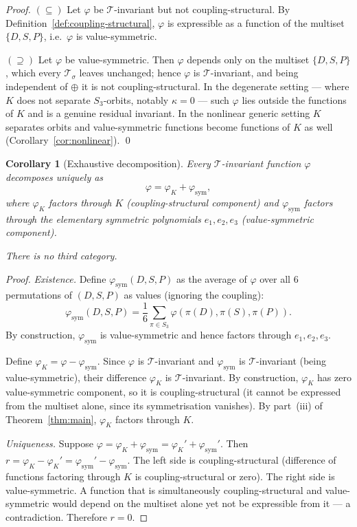 \documentclass[12pt,a4paper]{article}
\theoremstyle{definition}
\theoremstyle{plain}
\newtheorem{corollary}[theorem]{Corollary}
\theoremstyle{remark}
\newcommand{\T}{\mathcal{T}}
\begin{document}
\begin{proof}
$(\subseteq)$\; Let $\varphi$ be $\T$-invariant but not coupling-structural. By Definition~\ref{def:coupling-structural}, $\varphi$ is expressible as a function of the multiset $\{D, S, P\}$, i.e.\ $\varphi$ is value-symmetric.

$(\supseteq)$\; Let $\varphi$ be value-symmetric. Then $\varphi$ depends only on the multiset $\{D,S,P\}$, which every $\T_\sigma$ leaves unchanged; hence $\varphi$ is $\T$-invariant, and being independent of $\oplus$ it is not coupling-structural. In the degenerate setting --- where $K$ does not separate $S_3$-orbits, notably $\kappa = 0$ --- such $\varphi$ lies outside the functions of $K$ and is a genuine residual invariant. In the nonlinear generic setting $K$ separates orbits and value-symmetric functions become functions of $K$ as well (Corollary~\ref{cor:nonlinear}). \qed
\end{proof}

\begin{corollary}[Exhaustive decomposition]\label{cor:decomp}
Every $\T$-invariant function $\varphi$ decomposes uniquely as
\[
\varphi = \varphi_K + \varphi_{\mathrm{sym}},
\]
where $\varphi_K$ factors through $K$ (coupling-structural component) and $\varphi_{\mathrm{sym}}$ factors through the elementary symmetric polynomials $e_1, e_2, e_3$ (value-symmetric component).

There is no third category.
\end{corollary}

\begin{proof}
\emph{Existence.}\; Define $\varphi_{\mathrm{sym}}(D,S,P)$ as the average of $\varphi$ over all $6$ permutations of $(D,S,P)$ as values (ignoring the coupling):
\[
\varphi_{\mathrm{sym}}(D,S,P) = \frac{1}{6}\sum_{\pi \in S_3} \varphi(\pi(D), \pi(S), \pi(P)).
\]
By construction, $\varphi_{\mathrm{sym}}$ is value-symmetric and hence factors through $e_1, e_2, e_3$.

Define $\varphi_K = \varphi - \varphi_{\mathrm{sym}}$. Since $\varphi$ is $\T$-invariant and $\varphi_{\mathrm{sym}}$ is $\T$-invariant (being value-symmetric), their difference $\varphi_K$ is $\T$-invariant. By construction, $\varphi_K$ has zero value-symmetric component, so it is coupling-structural (it cannot be expressed from the multiset alone, since its symmetrisation vanishes). By part~(iii) of Theorem~\ref{thm:main}, $\varphi_K$ factors through $K$.

\emph{Uniqueness.}\; Suppose $\varphi = \varphi_K + \varphi_{\mathrm{sym}} = \varphi_K' + \varphi_{\mathrm{sym}}'$. Then $r = \varphi_K - \varphi_K' = \varphi_{\mathrm{sym}}' - \varphi_{\mathrm{sym}}$. The left side is coupling-structural (difference of functions factoring through $K$ is coupling-structural or zero). The right side is value-symmetric. A function that is simultaneously coupling-structural and value-symmetric would depend on the multiset alone yet not be expressible from it --- a contradiction. Therefore $r = 0$.
\end{proof}
\end{document}
